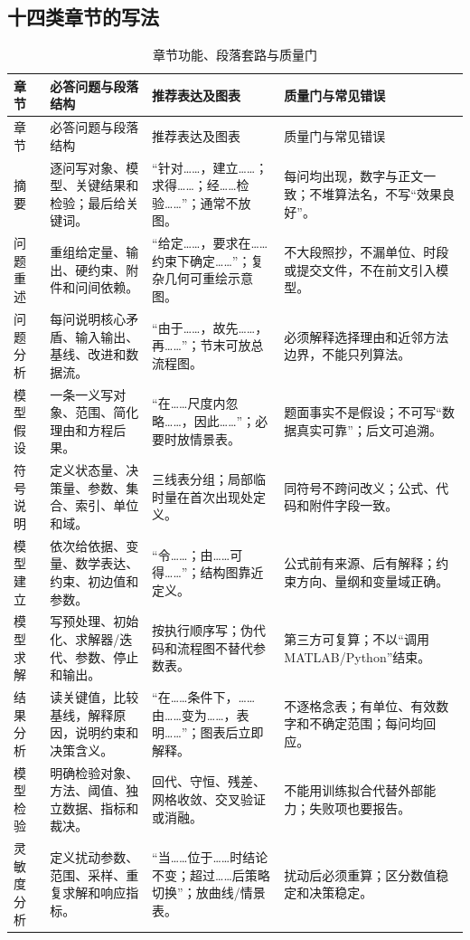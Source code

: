 \subsection{十四类章节的写法}

\begin{longtable}{p{1.8cm}p{4.2cm}p{4.0cm}p{4.0cm}}
\caption{章节功能、段落套路与质量门}\label{tab:sections}\\
\toprule
章节 & 必答问题与段落结构 & 推荐表达及图表 & 质量门与常见错误\\
\midrule
\endfirsthead
\toprule
章节 & 必答问题与段落结构 & 推荐表达及图表 & 质量门与常见错误\\
\midrule
\endhead
摘要 & 逐问写对象、模型、关键结果和检验；最后给关键词。 & “针对……，建立……；求得……；经……检验……”；通常不放图。 & 每问均出现，数字与正文一致；不堆算法名，不写“效果良好”。\\
问题重述 & 重组给定量、输出、硬约束、附件和问间依赖。 & “给定……，要求在……约束下确定……”；复杂几何可重绘示意图。 & 不大段照抄，不漏单位、时段或提交文件，不在前文引入模型。\\
问题分析 & 每问说明核心矛盾、输入输出、基线、改进和数据流。 & “由于……，故先……，再……”；节末可放总流程图。 & 必须解释选择理由和近邻方法边界，不能只列算法。\\
模型假设 & 一条一义写对象、范围、简化理由和方程后果。 & “在……尺度内忽略……，因此……”；必要时放情景表。 & 题面事实不是假设；不可写“数据真实可靠”；后文可追溯。\\
符号说明 & 定义状态量、决策量、参数、集合、索引、单位和域。 & 三线表分组；局部临时量在首次出现处定义。 & 同符号不跨问改义；公式、代码和附件字段一致。\\
模型建立 & 依次给依据、变量、数学表达、约束、初边值和参数。 & “令……；由……可得……”；结构图靠近定义。 & 公式前有来源、后有解释；约束方向、量纲和变量域正确。\\
模型求解 & 写预处理、初始化、求解器/迭代、参数、停止和输出。 & 按执行顺序写；伪代码和流程图不替代参数表。 & 第三方可复算；不以“调用 MATLAB/Python”结束。\\
结果分析 & 读关键值，比较基线，解释原因，说明约束和决策含义。 & “在……条件下，……由……变为……，表明……”；图表后立即解释。 & 不逐格念表；有单位、有效数字和不确定范围；每问均回应。\\
模型检验 & 明确检验对象、方法、阈值、独立数据、指标和裁决。 & 回代、守恒、残差、网格收敛、交叉验证或消融。 & 不能用训练拟合代替外部能力；失败项也要报告。\\
灵敏度分析 & 定义扰动参数、范围、采样、重复求解和响应指标。 & “当……位于……时结论不变；超过……后策略切换”；放曲线/情景表。 & 扰动后必须重算；区分数值稳定和决策稳定。\\

\end{longtable}
